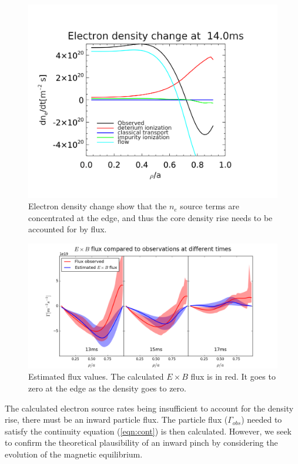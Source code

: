 \documentclass[aip, pop, preprint]{revtex4-1}
\begin{document}
\begin{figure}
	\centering
	\includegraphics[width=0.95\linewidth]{./plots/dndt_at14-1}	
	\caption{Electron density change show that the $n_e$ source terms are concentrated at the edge, and thus the core density rise needs to be accounted for by flux.}
	\label{fig:ne_change}
\end{figure}

\begin{figure}
	\centering
	\includegraphics[width=0.95\linewidth]{./plots/flux_comp}
	\caption{Estimated flux values. The calculated $ E\times B $ flux is in red. It goes to zero at the edge as the density goes to zero.}
	\label{fig:flux_compare}


\end{figure}

The calculated electron source rates being insufficient to account for the
density rise, there must be an inward particle flux. The particle flux
($\Gamma_{obs}$) needed to satisfy the continuity equation (\ref{eqn:cont}) is
then calculated. However, we seek to confirm the theoretical plausibility of an
inward pinch by considering the evolution of the magnetic equilibrium.
\end{document}
